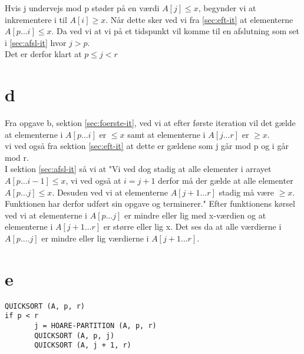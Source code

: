 \documentclass[10pt,a4paper,danish]{article}
\begin{document}
Hvis j undervejs mod p støder på en værdi $A[j] \leq x$, begynder vi at inkrementere i til $A[i] \geq x$. Når dette sker ved vi fra \ref{sec:eft-it} at elementerne $A[p\ldots i] \leq x$. Da ved vi at vi på et tidspunkt vil komme til en afslutning som set i \ref{sec:afsl-it} hvor $j > p$.
\\

Det er derfor klart at $p \leq j < r$



\section{d}

Fra opgave b, sektion \ref{sec:foerste-it}, ved vi at efter første iteration vil det gælde at elementerne i $A[p\ldots i]$ er $\leq x$ samt at elementerne i $A[j\ldots r]$ er $\geq x$. 
\\

vi ved også fra sektion \ref{sec:eft-it} at dette er gældene som j går mod p og i går mod r.
\\

I sektion \ref{sec:afsl-it} så vi at "Vi ved dog stadig at alle elementer i arrayet $A[p\ldots i-1] \leq x$, vi ved også at $i = j+1$ derfor må der gælde at alle elementer $A[p\ldots j] \leq x$. Desuden ved vi at elementerne $A[j+1\ldots r]$ stadig må være $\geq x$. 
Funktionen har derfor udført sin opgave og terminerer."
Efter funktionens kørsel ved vi at elementerne i $A[p\ldots j]$ er mindre eller lig med x-værdien og at elementerne i $A[j+1\ldots r]$ er større eller lig x. Det ses da at alle værdierne i $A[p.\ldots j]$ er mindre eller lig værdierne i $A[j+1\ldots r]$. 

\section{e}
\begin{verbatim}
QUICKSORT (A, p, r)
if p < r
       j = HOARE-PARTITION (A, p, r)
       QUICKSORT (A, p, j)
       QUICKSORT (A, j + 1, r)
\end{verbatim}
\end{document}
